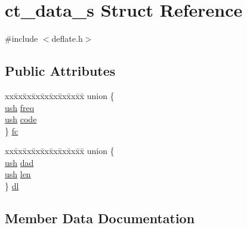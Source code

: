 \hypertarget{structct__data__s}{}\section{ct\+\_\+data\+\_\+s Struct Reference}
\label{structct__data__s}


{\ttfamily \#include $<$deflate.\+h$>$}

\subsection*{Public Attributes}
\begin{DoxyCompactItemize}
\item 
\begin{tabbing}
xx\=xx\=xx\=xx\=xx\=xx\=xx\=xx\=xx\=\kill
union \{\\
\>\hyperlink{zutil_8h_a3754180d606d4ed15468d15d9665aa2e}{ush} \hyperlink{structct__data__s_a67cd3c3267ba768c4494b36d5929c4bf}{freq}\\
\>\hyperlink{zutil_8h_a3754180d606d4ed15468d15d9665aa2e}{ush} \hyperlink{structct__data__s_a242f709ab288db2d155e28ce98c510c5}{code}\\
\} \hyperlink{structct__data__s_a4f9c9f1c63d48a747d49c9f441a5c8c0}{fc}\\

\end{tabbing}\item 
\begin{tabbing}
xx\=xx\=xx\=xx\=xx\=xx\=xx\=xx\=xx\=\kill
union \{\\
\>\hyperlink{zutil_8h_a3754180d606d4ed15468d15d9665aa2e}{ush} \hyperlink{structct__data__s_a73955d00dbdac5ad4027804a00726bfa}{dad}\\
\>\hyperlink{zutil_8h_a3754180d606d4ed15468d15d9665aa2e}{ush} \hyperlink{structct__data__s_ad7f6929b2907e046dfbc8f091b494cfb}{len}\\
\} \hyperlink{structct__data__s_a1de4b7880172e0218dc66e04573627d8}{dl}\\

\end{tabbing}\end{DoxyCompactItemize}


\subsection{Member Data Documentation}
\mbox{\label{structct__data__s_a242f709ab288db2d155e28ce98c510c5}} 
